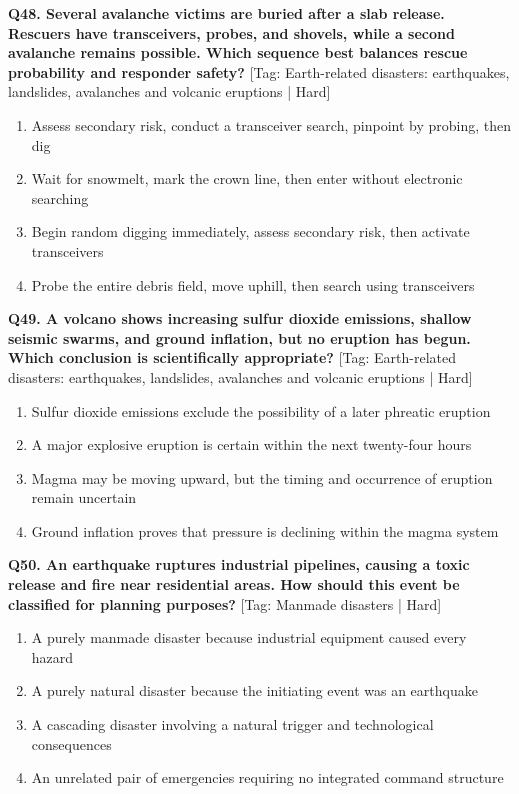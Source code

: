 \noindent\textbf{Q48. Several avalanche victims are buried after a slab release. Rescuers have transceivers, probes, and shovels, while a second avalanche remains possible. Which sequence best balances rescue probability and responder safety?} \hfill [Tag: Earth-related disasters: earthquakes, landslides, avalanches and volcanic eruptions | Hard]
\begin{enumerate}[label=(\alph*),topsep=2pt,itemsep=1pt,partopsep=0pt,parsep=0pt]
    \item {Assess secondary risk, conduct a transceiver search, pinpoint by probing, then dig}
    \item {Wait for snowmelt, mark the crown line, then enter without electronic searching}
    \item {Begin random digging immediately, assess secondary risk, then activate transceivers}
    \item {Probe the entire debris field, move uphill, then search using transceivers}
\end{enumerate}
\vspace{2mm}

\noindent\textbf{Q49. A volcano shows increasing sulfur dioxide emissions, shallow seismic swarms, and ground inflation, but no eruption has begun. Which conclusion is scientifically appropriate?} \hfill [Tag: Earth-related disasters: earthquakes, landslides, avalanches and volcanic eruptions | Hard]
\begin{enumerate}[label=(\alph*),topsep=2pt,itemsep=1pt,partopsep=0pt,parsep=0pt]
    \item {Sulfur dioxide emissions exclude the possibility of a later phreatic eruption}
    \item {A major explosive eruption is certain within the next twenty-four hours}
    \item {Magma may be moving upward, but the timing and occurrence of eruption remain uncertain}
    \item {Ground inflation proves that pressure is declining within the magma system}
\end{enumerate}
\vspace{2mm}

\noindent\textbf{Q50. An earthquake ruptures industrial pipelines, causing a toxic release and fire near residential areas. How should this event be classified for planning purposes?} \hfill [Tag: Manmade disasters | Hard]
\begin{enumerate}[label=(\alph*),topsep=2pt,itemsep=1pt,partopsep=0pt,parsep=0pt]
    \item {A purely manmade disaster because industrial equipment caused every hazard}
    \item {A purely natural disaster because the initiating event was an earthquake}
    \item {A cascading disaster involving a natural trigger and technological consequences}
    \item {An unrelated pair of emergencies requiring no integrated command structure}
\end{enumerate}
\vspace{2mm}

